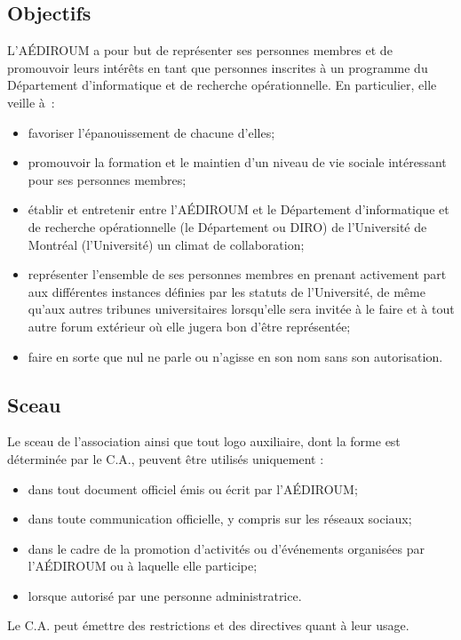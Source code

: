 \documentclass{aediroum}
\begin{document}
\subsection{Objectifs}\label{sec:objectifs}

L'AÉDIROUM a pour but de représenter ses personnes membres et de promouvoir leurs intérêts en tant que personnes inscrites à un programme du Département d'informatique et de recherche opérationnelle. En particulier, elle veille à~:
\begin{itemize}
\item favoriser l'épanouissement de chacune d'elles;
\item promouvoir la formation et le maintien d'un niveau de vie sociale intéressant pour ses personnes membres;
\item établir et entretenir entre l'AÉDIROUM et le Département d'informatique et de recherche opérationnelle (le Département ou DIRO) de l'Université de Montréal (l'Université) un climat de collaboration;
\item représenter l'ensemble de ses personnes membres en prenant activement part aux différentes instances définies par les statuts de l'Université, de même qu'aux autres tribunes universitaires lorsqu'elle sera invitée à le faire et à tout autre forum extérieur où elle jugera bon d'être représentée;
\item faire en sorte que nul ne parle ou n'agisse en son nom sans son autorisation.
\end{itemize}


\subsection{Sceau}\label{sec:sceau}
Le sceau de l'association ainsi que tout logo auxiliaire, dont la forme est déterminée par le C.A., peuvent être utilisés uniquement :
\begin{itemize}
    \item dans tout document officiel émis ou écrit par l'AÉDIROUM;
    \item dans toute communication officielle, y compris sur les réseaux sociaux;
    \item dans le cadre de la promotion d'activités ou d'événements organisées par l'AÉDIROUM ou à laquelle elle participe;
    \item lorsque autorisé par une personne administratrice.
\end{itemize}

Le C.A. peut émettre des restrictions et des directives quant à leur usage.
\end{document}
